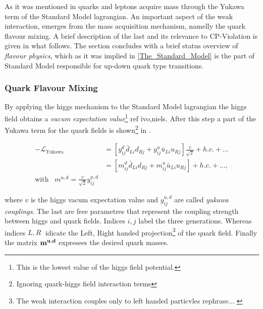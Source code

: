 As it was mentioned in  quarks and leptons acquire mass through the Yukawa term
of the Standard Model lagrangian. An important aspect of the weak interaction, emerges from the mass acquisition mechanism,
namelly the quark flavour mixing. A brief description of the last and its relevance to CP-Violation is given in what follows.
The section concludes with a brief status overview of {\it flavour physics}, which as it was implied in \ref{The_Standard_Model}
is the part of Standard Model responsible for up-down quark type transitions.

\subsubsection{Quark Flavour Mixing}
By applying the higgs mechanism to the Standard Model lagrangian the higgs field obtains a
{\it vacum expectation value}\footnote{This is the lowest value of the higgs field potential.} {\color{red} ref ivo,niels}.
After this step a part of the Yukawa term for the quark fields is
shown\footnote{Ignoring quark-higgs field interaction terms} in .

\begin{subequations}
\label{yukawa_flavour}
  \begin{align}
  -\mathscr{L}_{\text{Yukawa}} &= \left[ y_{ij}^d \bar{d}_{Li} d_{Rj} + y_{ij}^u \bar{u}_{Li} u_{Rj} \right] \frac{v}{\sqrt{2}} + h.c. + ...  \\
                               &= \left[ m_{ij}^d \bar{d}_{Li} d_{Rj} + m_{ij}^u \bar{u}_{Li} u_{Rj} \right] + h.c. + ...,  \\
                               \text{with} \;\;\; m^{u,d} = \frac{v}{\sqrt{2}} y_{ij}^{u,d} & \nonumber
  \end{align}
\end{subequations}

\noindent where $v$ is the higgs vacum expectation value and $y_{ij}^{u,d}$ are called {\it yukawa couplings}.
The last are free parametres that represent the coupling strength between higgs and quark fields.
Indices $i,j$ label the three generations. Whereas indices $L,R\;$ idicate the Left, Right handed
projection\footnote{The weak interaction couples only to left handed particvles {\color{red} rephrase... }} of the quark field.
Finally the matrix $\bf m^{u,d}$ expresees the desired quark masses.

